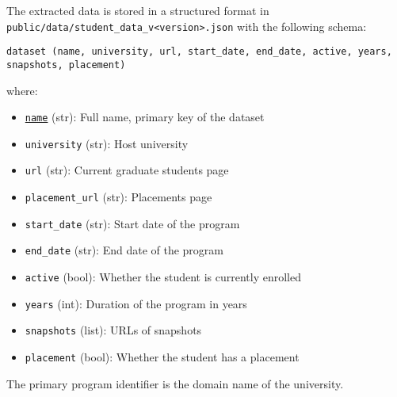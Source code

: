 \documentclass[11pt]{article}
\begin{document}

The extracted data is stored in a structured format in \texttt{public/data/student\_data\_v<version>.json} with the following schema:

\begin{verbatim}
dataset (name, university, url, start_date, end_date, active, years, snapshots, placement)
\end{verbatim}

\noindent where:
\begin{itemize}
    \item \underline{\texttt{name}} (str): Full name, primary key of the dataset
    \item \texttt{university} (str): Host university
    \item \texttt{url} (str): Current graduate students page
    \item \texttt{placement\_url} (str): Placements page
    \item \texttt{start\_date} (str): Start date of the program
    \item \texttt{end\_date} (str): End date of the program
    \item \texttt{active} (bool): Whether the student is currently enrolled
    \item \texttt{years} (int): Duration of the program in years
    \item \texttt{snapshots} (list): URLs of snapshots
    \item \texttt{placement} (bool): Whether the student has a placement
\end{itemize}
%
The primary program identifier is the domain name of the university.

%
\end{document}
